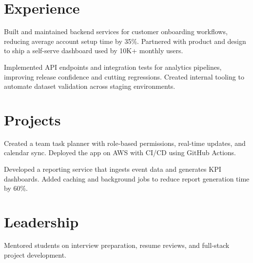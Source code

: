 \documentclass[]{deedy-resume-openfont}
\begin{document}
\hfill
\begin{minipage}[t]{0.66\textwidth}

\section{Experience}

Built and maintained backend services for customer onboarding workflows, reducing average account setup time by 35\%. Partnered with product and design to ship a self-serve dashboard used by 10K+ monthly users.
\sectionsep

Implemented API endpoints and integration tests for analytics pipelines, improving release confidence and cutting regressions. Created internal tooling to automate dataset validation across staging environments.
\sectionsep

\section{Projects}

Created a team task planner with role-based permissions, real-time updates, and calendar sync. Deployed the app on AWS with CI/CD using GitHub Actions.
\sectionsep

Developed a reporting service that ingests event data and generates KPI dashboards. Added caching and background jobs to reduce report generation time by 60\%.
\sectionsep

\section{Leadership}
Mentored students on interview preparation, resume reviews, and full-stack project development.
\sectionsep

\end{minipage}
\end{document}
